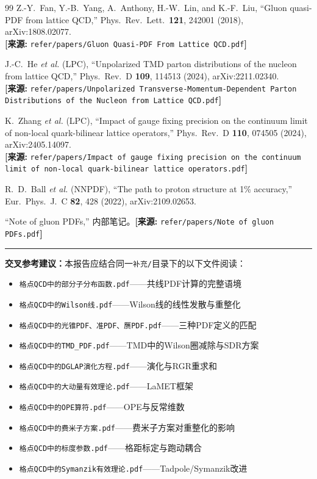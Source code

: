 \documentclass[12pt,a4paper]{ctexart}
\theoremstyle{definition}
\begin{document}
\begin{thebibliography}{99}
Z.-Y.~Fan, Y.-B.~Yang, A.~Anthony, H.-W.~Lin, and K.-F.~Liu,
``Gluon quasi-PDF from lattice QCD,''
Phys.\ Rev.\ Lett.\ \textbf{121}, 242001 (2018), arXiv:1808.02077.
\\\textbf{[来源:} \texttt{refer/papers/Gluon Quasi-PDF From Lattice QCD.pdf}\textbf{]}

J.-C.~He \textit{et al.} (LPC),
``Unpolarized TMD parton distributions of the nucleon from lattice QCD,''
Phys.\ Rev.\ D \textbf{109}, 114513 (2024), arXiv:2211.02340.
\\\textbf{[来源:} \texttt{refer/papers/Unpolarized Transverse-Momentum-Dependent Parton Distributions of the Nucleon from Lattice QCD.pdf}\textbf{]}

K.~Zhang \textit{et al.} (LPC),
``Impact of gauge fixing precision on the continuum limit of non-local quark-bilinear lattice operators,''
Phys.\ Rev.\ D \textbf{110}, 074505 (2024), arXiv:2405.14097.
\\\textbf{[来源:} \texttt{refer/papers/Impact of gauge fixing precision on the continuum limit of non-local quark-bilinear lattice operators.pdf}\textbf{]}

R.~D.~Ball \textit{et al.} (NNPDF),
``The path to proton structure at 1\% accuracy,''
Eur.\ Phys.\ J.\ C \textbf{82}, 428 (2022), arXiv:2109.02653.

``Note of gluon PDFs,'' 内部笔记。\textbf{[来源:} \texttt{refer/papers/Note of gluon PDFs.pdf}\textbf{]}

\end{thebibliography}

\vspace{0.5cm}
\noindent\rule{\textwidth}{0.5pt}
\small
\textbf{交叉参考建议：}本报告应结合同一\texttt{补充/}目录下的以下文件阅读：
\begin{itemize}[nosep]
    \item \texttt{格点QCD中的部分子分布函数.pdf}——共线PDF计算的完整语境
    \item \texttt{格点QCD中的Wilson线.pdf}——Wilson线的线性发散与重整化
    \item \texttt{格点QCD中的光锥PDF、准PDF、赝PDF.pdf}——三种PDF定义的匹配
    \item \texttt{格点QCD中的TMD\_PDF.pdf}——TMD中的Wilson圈减除与SDR方案
    \item \texttt{格点QCD中的DGLAP演化方程.pdf}——演化与RGR重求和
    \item \texttt{格点QCD中的大动量有效理论.pdf}——LaMET框架
    \item \texttt{格点QCD中的OPE算符.pdf}——OPE与反常维数
    \item \texttt{格点QCD中的费米子方案.pdf}——费米子方案对重整化的影响
    \item \texttt{格点QCD中的标度参数.pdf}——格距标定与跑动耦合
    \item \texttt{格点QCD中的Symanzik有效理论.pdf}——Tadpole/Symanzik改进
\end{itemize}
\end{document}
